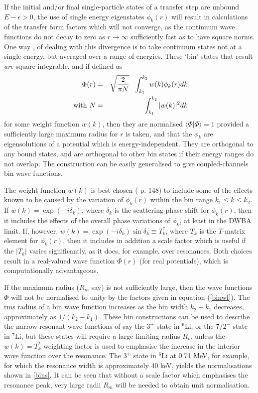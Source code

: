 \documentclass[11pt,a4paper]{article}
\begin{document}
If the initial and/or final single-particle states of a transfer step
are unbound $E - \epsilon> 0$, the use of single energy eigenstates
$\phi_k (r)$ will result in calculations of the
transfer form factors which will not converge, as the continuum wave
functions do not decay to zero as $ r \rightarrow \infty$
sufficiently fast as to have square norms.
One way \cite{CDCC}, \cite{CDCC2}
of dealing with this divergence is to take continuum states
not at a single energy, but averaged over a range of energies.
These `bin' states that result {\em are} square integrable,
and if defined as
\begin{eqnarray} \label{binwf}
 \Phi (r) &=& \sqrt {2 \over \pi N} ~~
            \int_ {k_1} ^ {k_2} w(k)\phi_k (r) dk
\\
\mbox{ with } N &=& \int_ {k_1} ^ {k_2} |w(k)| ^ 2 dk
\end{eqnarray}
for some weight function $w(k)$,
then they are normalised $\langle\Phi |\Phi\rangle = 1 $
provided a sufficiently large maximum radius for $r$ is taken,
and that the
$\phi_k$ are eigensolutions of a potential which is
energy-independent.
They are orthogonal to any bound states, and are orthogonal to other bin
states if their energy ranges do not overlap.
The construction can be easily generalised to give coupled-channels
bin wave functions.

The weight function $ w(k) $ is best chosen
(\cite{CDCC2} p. 148)
to include some of the effects known to be caused by the variation of
$\phi_k (r) $ within the bin range
$ k_1 \leq k \leq k_2 $.
If $ w(k) = \exp ( - i \delta_k ) $, where $\delta_k$
is the scattering phase shift for $\phi_k (r) $,
then it includes the effects of the overall phase variations
of $\phi_k  $, at least in the
DWBA limit.
If, however,
$ w(k) = \exp ( - i \delta_k ) \sin {\delta_k}
         \equiv T_k^* $, where $T_k$
is the $T$-matrix element for $\phi_k (r) $,
then it includes in addition a scale factor which is useful if the
$ | T_k | $ varies significantly, as it does, for example, over
resonances. Both choices result in a real-valued wave function
$\Phi (r) $ (for real potentials), which is computationally
advantageous.

If the maximum radius ($R_m $ say) is not sufficiently large,
then the wave functions $\Phi$ will not be normalised to unity by the factors
given in equation (\ref{binwf}).
The rms radius of a bin wave function increases as the bin width
$k_2 - k_1 $ decreases, approximately as
$1/(k_2 - k_1)$.
These bin constructions can be used to describe the narrow resonant wave
functions of say the $3^+$ state in $^6$Li,
or the $ 7/2^-$ state in $^7$Li,
but these states will require a large limiting radius $R_m $
unless the
$ w(k) = T_k^* $ weighting factor is used to emphasise
the increase in the interior wave function over the resonance.
The $ 3^+ $ state in $^6$Li at 0.71 MeV, for example, for which the
resonance width is approximately 40 keV, yields the normalisations shown in
\ref{bins}. It can be seen that without a scale factor which
emphasises the resonance peak, very large radii $ R_m$ will be
needed to obtain unit normalisation.
\end{document}
